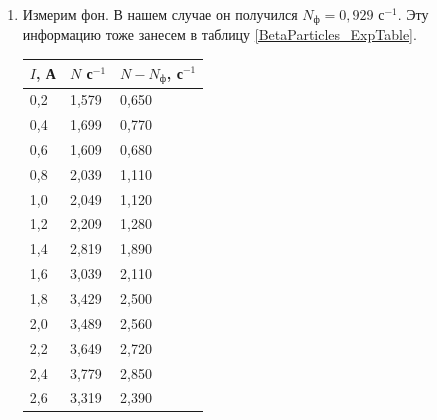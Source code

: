 \begin{enumerate}
		\item Измерим фон. В нашем случае он получился $N_\text{ф} = 0,929$ с$^{-1}$. Эту информацию тоже занесем в таблицу \ref{BetaParticles_ExpTable}. 
		
		\begin{table}[h!]
			\centering
				\begin{tabular}{|l|l|l|}
					\hline
					\multicolumn{1}{|r|}{$I$, А} & \multicolumn{1}{r|}{$N$ с$^{-1}$} & \multicolumn{1}{r|}{$N - N_\text{ф}$, с$^{-1}$} \\ \hline
					0,2                          & 1,579                             & 0,650                                           \\ \hline
					0,4                          & 1,699                             & 0,770                                           \\ \hline
					0,6                          & 1,609                             & 0,680                                           \\ \hline
					0,8                          & 2,039                             & 1,110                                           \\ \hline
					1,0                          & 2,049                             & 1,120                                           \\ \hline
					1,2                          & 2,209                             & 1,280                                           \\ \hline
					1,4                          & 2,819                             & 1,890                                           \\ \hline
					1,6                          & 3,039                             & 2,110                                           \\ \hline
					1,8                          & 3,429                             & 2,500                                           \\ \hline
					2,0                          & 3,489                             & 2,560                                           \\ \hline
					2,2                          & 3,649                             & 2,720                                           \\ \hline
					2,4                          & 3,779                             & 2,850                                           \\ \hline
					2,6                          & 3,319                             & 2,390                                           \\ \hline

\end{tabular}
\end{table}
\end{enumerate}
